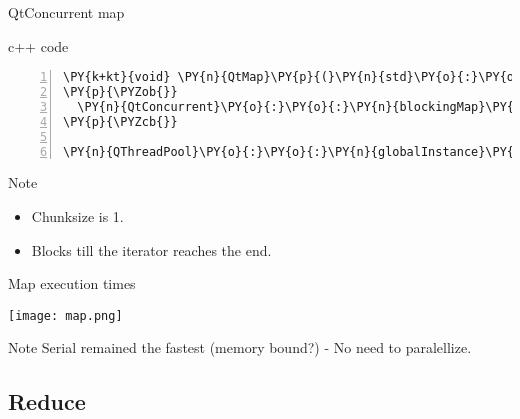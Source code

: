 \documentclass{beamer}
\begin{document}


\begin{frame}[fragile]{QtConcurrent map}

\begin{block}{c++ code}

\tiny
\begin{Verbatim}[commandchars=\\\{\},numbers=left,firstnumber=1,stepnumber=1]
\PY{k+kt}{void} \PY{n}{QtMap}\PY{p}{(}\PY{n}{std}\PY{o}{:}\PY{o}{:}\PY{n}{vector}\PY{o}{<}\PY{k+kt}{float}\PY{o}{>}\PY{o}{&} \PY{n}{data}\PY{p}{)}
\PY{p}{\PYZob{}}
  \PY{n}{QtConcurrent}\PY{o}{:}\PY{o}{:}\PY{n}{blockingMap}\PY{p}{(}\PY{n}{data}\PY{p}{,} \PY{n}{modify}\PY{p}{)}\PY{p}{;}
\PY{p}{\PYZcb{}}

\PY{n}{QThreadPool}\PY{o}{:}\PY{o}{:}\PY{n}{globalInstance}\PY{p}{(}\PY{p}{)}\PY{o}{-}\PY{o}{>}\PY{n}{setMaxThreadCount}\PY{p}{(}\PY{n}{NUMBER\PYZus{}OF\PYZus{}THREADS}\PY{p}{)}\PY{p}{;}
\end{Verbatim}


\end{block}

\begin{exampleblock}{Note}
  \small
  \begin{itemize}
    \item Chunksize is 1.
    \item Blocks till the iterator reaches the end.
  \end{itemize}
\end{exampleblock}

\end{frame}


\begin{frame}[fragile]{Map execution times}

\begin{center}
\texttt{[image: map.png]} 
\end{center}

\begin{exampleblock}{Note}
\small
Serial remained the fastest (memory bound?) - No need to paralellize.
\end{exampleblock}

\end{frame}

\subsection{Reduce}
\end{document}
